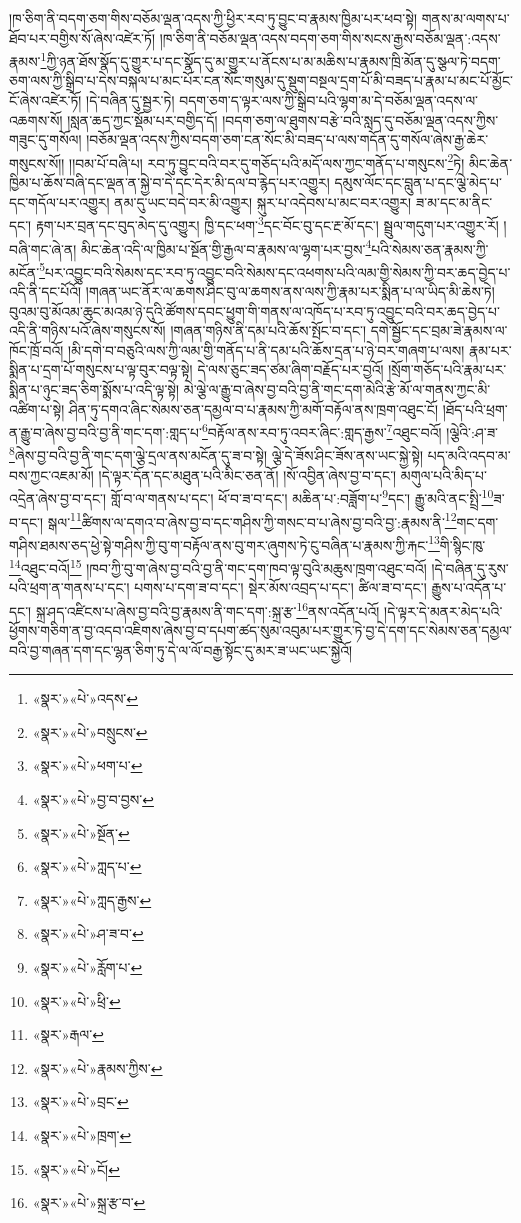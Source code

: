 །ཁ་ཅིག་ནི་བདག་ཅག་གིས་བཅོམ་ལྡན་འདས་ཀྱི་ཕྱིར་རབ་ཏུ་བྱུང་བ་རྣམས་ཁྱིམ་པར་ཕབ་སྟེ། གནས་མ་ལགས་པ་ཐོབ་པར་བགྱིས་སོ་ཞེས་འཛེར་ཏོ། །ཁ་ཅིག་ནི་བཅོམ་ལྡན་འདས་བདག་ཅག་གིས་སངས་རྒྱས་བཅོམ་ལྡན་:འདས་རྣམས་\footnote{«སྣར་»«པེ་»འདས་}ཀྱི་ཉན་ཐོས་སྣོད་དུ་གྱུར་པ་དང་སྣོད་དུ་མ་གྱུར་པ་ནོངས་པ་མ་མཆིས་པ་རྣམས་ཁྲི་མོན་དུ་སྩལ་ཏེ་བདག་ཅག་ལས་ཀྱི་སྒྲིབ་པ་དེས་བསྐལ་པ་མང་པོར་ངན་སོང་གསུམ་དུ་སྡུག་བསྔལ་དྲག་པོ་མི་བཟད་པ་རྣམ་པ་མང་པོ་མྱོང་ངོ་ཞེས་འཛེར་ཏོ། །དེ་བཞིན་དུ་སྦྱར་ཏེ། བདག་ཅག་ད་ལྟར་ལས་ཀྱི་སྒྲིབ་པའི་ལྷག་མ་དེ་བཅོམ་ལྡན་འདས་ལ་འཆགས་སོ། །སླན་ཆད་ཀྱང་སྡོམ་པར་བགྱིད་དོ། །བདག་ཅག་ལ་ཐུགས་བརྩེ་བའི་སླད་དུ་བཅོམ་ལྡན་འདས་ཀྱིས་གཟུང་དུ་གསོལ། །བཅོམ་ལྡན་འདས་ཀྱིས་བདག་ཅག་ངན་སོང་མི་བཟད་པ་ལས་གདོན་དུ་གསོལ་ཞེས་རྒྱ་ཆེར་གསུངས་སོ།། །།བམ་པོ་བཞི་པ། རབ་ཏུ་བྱུང་བའི་བར་དུ་གཅོད་པའི་མདོ་ལས་ཀྱང་གནོད་པ་གསུངས་\footnote{«སྣར་»«པེ་»བསྲུངས་}ཏེ། མིང་ཆེན་ཁྱིམ་པ་ཆོས་བཞི་དང་ལྡན་ན་སྐྱེ་བ་དེ་དང་དེར་མི་དལ་བ་རྙེད་པར་འགྱུར། དམུས་ལོང་དང་བླུན་པ་དང་ལྕེ་མེད་པ་དང་གདོལ་པར་འགྱུར། ནམ་དུ་ཡང་བདེ་བར་མི་འགྱུར། སྐུར་པ་འདེབས་པ་མང་བར་འགྱུར། ཟ་མ་དང་མ་ནིང་དང་། རྟག་པར་བྲན་དང་བུད་མེད་དུ་འགྱུར། ཁྱི་དང་ཕག་\footnote{«སྣར་»«པེ་»ཕག་པ་}དང་བོང་བུ་དང་རྔ་མོ་དང་། སྦྲུལ་གདུག་པར་འགྱུར་རོ། །བཞི་གང་ཞེ་ན། མིང་ཆེན་འདི་ལ་ཁྱིམ་པ་སྔོན་གྱི་རྒྱལ་བ་རྣམས་ལ་ལྷག་པར་བྱས་\footnote{«སྣར་»«པེ་»བྱ་བ་བྱས་}པའི་སེམས་ཅན་རྣམས་ཀྱི་མངོན་\footnote{«སྣར་»«པེ་»སྔོན་}པར་འབྱུང་བའི་སེམས་དང་རབ་ཏུ་འབྱུང་བའི་སེམས་དང་འཕགས་པའི་ལམ་གྱི་སེམས་ཀྱི་བར་ཆད་བྱེད་པ་འདི་ནི་དང་པོའོ། །གཞན་ཡང་ནོར་ལ་ཆགས་ཤིང་བུ་ལ་ཆགས་ནས་ལས་ཀྱི་རྣམ་པར་སྨིན་པ་ལ་ཡིད་མི་ཆེས་ཏེ། བུའམ་བུ་མོའམ་ཆུང་མའམ་ཉེ་དུའི་ཚོགས་དབང་ཕྱུག་གི་གནས་ལ་འཁོད་པ་རབ་ཏུ་འབྱུང་བའི་བར་ཆད་བྱེད་པ་འདི་ནི་གཉིས་པའོ་ཞེས་གསུངས་སོ། །གཞན་གཉིས་ནི་དམ་པའི་ཆོས་སྤོང་བ་དང་། དགེ་སྦྱོང་དང་བྲམ་ཟེ་རྣམས་ལ་ཁོང་ཁྲོ་བའོ། །མི་དགེ་བ་བཅུའི་ལས་ཀྱི་ལམ་གྱི་གནོད་པ་ནི་དམ་པའི་ཆོས་དྲན་པ་ཉེ་བར་གཞག་པ་ལས། རྣམ་པར་སྨིན་པ་དྲག་པོ་གསུངས་པ་ལྟ་བུར་བལྟ་སྟེ། དེ་ལས་ཅུང་ཟད་ཙམ་ཞིག་བརྗོད་པར་བྱའོ། །སྲོག་གཅོད་པའི་རྣམ་པར་སྨིན་པ་ཉུང་ཟད་ཅིག་སྨོས་པ་འདི་ལྟ་སྟེ། མེ་ལྕེ་ལ་རྒྱུ་བ་ཞེས་བྱ་བའི་བྱ་ནི་གང་དག་མེའི་རྩེ་མོ་ལ་གནས་ཀྱང་མི་འཚིག་པ་སྟེ། ཤིན་ཏུ་དགའ་ཞིང་སེམས་ཅན་དམྱལ་བ་པ་རྣམས་ཀྱི་མགོ་བརྟོལ་ནས་ཁྲག་འཐུང་ངོ། །ཐོད་པའི་ཕྲག་ན་རྒྱུ་བ་ཞེས་བྱ་བའི་བྱ་ནི་གང་དག་:གླད་པ་\footnote{«སྣར་»«པེ་»ཀླད་པ་}བརྟོལ་ནས་རབ་ཏུ་འབར་ཞིང་:གླད་རྒྱས་\footnote{«སྣར་»«པེ་»ཀླད་རྒྱས་}འཐུང་བའོ། །ལྕེའི་:ཤ་ཟ་\footnote{«སྣར་»«པེ་»ཤ་ཟ་བ་}ཞེས་བྱ་བའི་བྱ་ནི་གང་དག་ལྕེ་དྲལ་ནས་མངོན་དུ་ཟ་བ་སྟེ། ལྕེ་དེ་ཟོས་ཤིང་ཟོས་ནས་ཡང་སྐྱེ་སྟེ། པད་མའི་འདབ་མ་བས་ཀྱང་འཇམ་མོ། །དེ་ལྟར་དོན་དང་མཐུན་པའི་མིང་ཅན་ནོ། །སོ་འབྱིན་ཞེས་བྱ་བ་དང་། མགུལ་པའི་མིད་པ་འདྲེན་ཞེས་བྱ་བ་དང་། གློ་བ་ལ་གནས་པ་དང་། ཕོ་བ་ཟ་བ་དང་། མཆིན་པ་:བཟློག་པ་\footnote{«སྣར་»«པེ་»རློག་པ་}དང་། རྒྱུ་མའི་ནང་སྤྲི་\footnote{«སྣར་»«པེ་»ཕྲི་}ཟ་བ་དང་། སྒལ་\footnote{«སྣར་»རྒལ་}ཚིགས་ལ་དགའ་བ་ཞེས་བྱ་བ་དང་གཤིས་ཀྱི་གསང་བ་པ་ཞེས་བྱ་བའི་བྱ་:རྣམས་ནི་\footnote{«སྣར་»«པེ་»རྣམས་ཀྱིས་}གང་དག་གཤིས་ཐམས་ཅད་ཕྱེ་སྟེ་གཤིས་ཀྱི་བུ་ག་བརྟོལ་ནས་བུ་གར་ཞུགས་ཏེ་ངུ་བཞིན་པ་རྣམས་ཀྱི་རྐང་\footnote{«སྣར་»«པེ་»བྲང་}གི་སྙིང་ཁུ་\footnote{«སྣར་»«པེ་»ཁྲག་}འཐུང་བའོ།\footnote{«སྣར་»«པེ་»ངོ།} །ཁབ་ཀྱི་བུ་ག་ཞེས་བྱ་བའི་བྱ་ནི་གང་དག་ཁབ་ལྟ་བུའི་མཆུས་ཁྲག་འཐུང་བའོ། །དེ་བཞིན་དུ་རུས་པའི་ཕྲག་ན་གནས་པ་དང་། པགས་པ་དག་ཟ་བ་དང་། སྡེར་མོས་འབྲད་པ་དང་། ཚིལ་ཟ་བ་དང་། རྒྱུས་པ་འདོན་པ་དང་། སྐྲ་ཤད་འཛིངས་པ་ཞེས་བྱ་བའི་བྱ་རྣམས་ནི་གང་དག་:སྐྲ་རྩ་\footnote{«སྣར་»«པེ་»སྐྲ་རྩ་བ་}ནས་འདོན་པའོ། །དེ་ལྟར་དེ་མནར་མེད་པའི་ཕྱོགས་གཅིག་ན་བྱ་འདབ་འཇིགས་ཞེས་བྱ་བ་དཔག་ཚད་སུམ་འབུམ་པར་གྱུར་ཏེ་བྱ་དེ་དག་དང་སེམས་ཅན་དམྱལ་བའི་བྱ་གཞན་དག་དང་ལྷན་ཅིག་ཏུ་དེ་ལ་ལོ་བརྒྱ་སྟོང་དུ་མར་ཟ་ཡང་ཡང་སྐྱེའོ། 